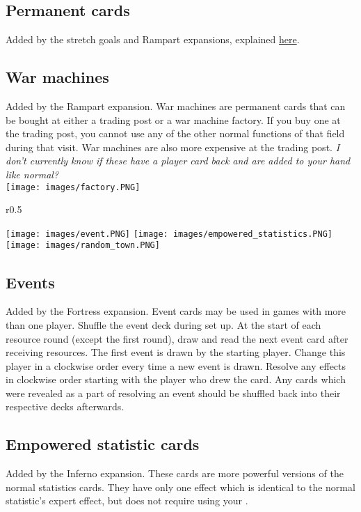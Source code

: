 \documentclass[12pt]{article}
\begin{document}
\subsection*{Permanent cards}
Added by the stretch goals and Rampart expansions, explained \hyperlink{Playerdecks}{here}.
\subsection*{War machines}
Added by the Rampart expansion. War machines are permanent cards that can be bought at either a trading post or a war machine factory. If you buy one at the trading post, you cannot use any of the other normal functions of that field during that visit. War machines are also more expensive at the trading post. \textit{I don't currently know if these have a player card back and are added to your hand like normal?}\\[6pt]
\texttt{[image: images/factory.PNG]}

\clearpage
\begin{wrapfigure}{r}{0.5\textwidth}
    \begin{center}
    \texttt{[image: images/event.PNG]}
    \texttt{[image: images/empowered\_statistics.PNG]}
    \texttt{[image: images/random\_town.PNG]}
    \end{center}
\end{wrapfigure}
\subsection*{Events}
Added by the Fortress expansion. Event cards may be used in games with more than one player. Shuffle the event deck during set up. At the start of each resource round (except the first round), draw and read the next event card after receiving resources. The first event is drawn by the starting player. Change this player in a clockwise order every time a new event is drawn. Resolve any effects in clockwise order starting with the player who drew the card. Any cards which were revealed as a part of resolving an event should be shuffled back into their respective decks afterwards.
\subsection*{Empowered statistic cards}
Added by the Inferno expansion. These cards are more powerful versions of the normal statistics cards. They have only one effect which is identical to the normal statistic's expert effect, but does not require using your .
\end{document}
